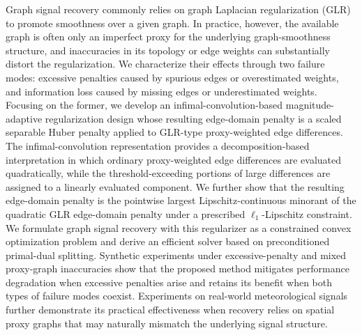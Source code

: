 Graph signal recovery commonly relies on graph Laplacian regularization (GLR) to promote smoothness over a given graph.
In practice, however, the available graph is often only an imperfect proxy for the underlying graph-smoothness structure, and inaccuracies in its topology or edge weights can substantially distort the regularization.
We characterize their effects through two failure modes: excessive penalties caused by spurious edges or overestimated weights, and information loss caused by missing edges or underestimated weights.
Focusing on the former, we develop an infimal-convolution-based magnitude-adaptive regularization design whose resulting edge-domain penalty is a scaled separable Huber penalty applied to GLR-type proxy-weighted edge differences.
The infimal-convolution representation provides a decomposition-based interpretation in which ordinary proxy-weighted edge differences are evaluated quadratically, while the threshold-exceeding portions of large differences are assigned to a linearly evaluated component.
We further show that the resulting edge-domain penalty is the pointwise largest Lipschitz-continuous minorant of the quadratic GLR edge-domain penalty under a prescribed $\ell_1$-Lipschitz constraint.
We formulate graph signal recovery with this regularizer as a constrained convex optimization problem and derive an efficient solver based on preconditioned primal-dual splitting.
Synthetic experiments under excessive-penalty and mixed proxy-graph inaccuracies show that the proposed method mitigates performance degradation when excessive penalties arise and retains its benefit when both types of failure modes coexist.
Experiments on real-world meteorological signals further demonstrate its practical effectiveness when recovery relies on spatial proxy graphs that may naturally mismatch the underlying signal structure.